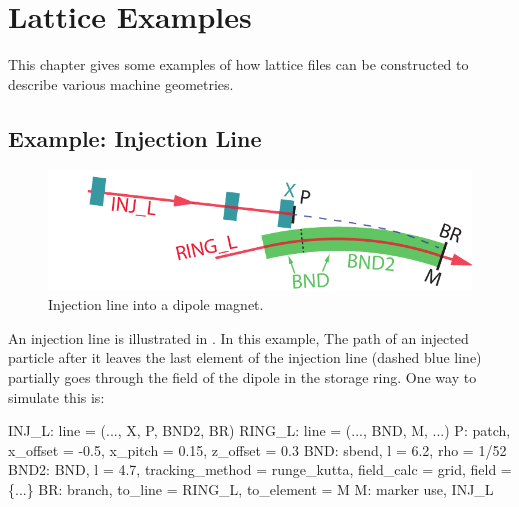 \chapter{Lattice Examples}
\label{c:lat.example}

This chapter gives some examples of how lattice files can be constructed to
describe various machine geometries.


\section{Example: Injection Line}
\label{s:ex.inj}

\begin{figure}[tb]
  \centering
  \includegraphics[width=5in]{injection.pdf}
  \caption[Injection line into a dipole magnet.]{
Injection line into a dipole magnet.
  }
  \label{f:inject}
\end{figure}

An injection line is illustrated in . In this example,
The path of an injected particle after it leaves the last element
 of the injection line (dashed blue line) partially goes through
the field of the dipole  in the storage ring. One way to
simulate this is:
\begin{example}
  INJ_L: line = (..., X, P, BND2, BR)
  RING_L: line = (..., BND, M, ...)
  P: patch, x_offset = -0.5, x_pitch = 0.15, z_offset = 0.3 
  BND: sbend, l = 6.2, rho = 1/52
  BND2: BND, l = 4.7, tracking_method = runge_kutta,
          field_calc = grid, field = \{...\}
  BR: branch, to_line = RING_L, to_element = M
  M: marker
  use, INJ_L
\end{example}

